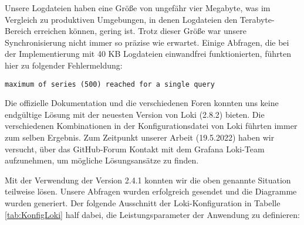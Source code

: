 

Unsere Logdateien haben eine Größe von ungefähr vier Megabyte, was im Vergleich zu produktiven Umgebungen, in denen Logdateien den Terabyte-Bereich erreichen können, gering ist. Trotz dieser Größe war unsere Synchronisierung nicht immer so präzise wie erwartet. Einige Abfragen, die bei der Implementierung mit 40 KB Logdateien einwandfrei funktionierten, führten hier zu folgender Fehlermeldung:

{
\begin{Verbatim}[fontsize=\small, frame=single]
maximum of series (500) reached for a single query  
\end{Verbatim}
}

Die offizielle Dokumentation und die verschiedenen Foren konnten uns keine endgültige Lösung mit der neuesten Version von Loki (2.8.2) bieten. Die verschiedenen Kombinationen in der Konfigurationsdatei von Loki führten immer zum selben Ergebnis. Zum Zeitpunkt unserer Arbeit (19.5.2022) haben wir versucht, über das GitHub-Forum Kontakt mit dem Grafana Loki-Team aufzunehmen, um mögliche Lösungsansätze zu finden.

Mit der Verwendung der Version 2.4.1 konnten wir die oben genannte Situation teilweise lösen. Unsere Abfragen wurden erfolgreich gesendet und die Diagramme wurden generiert. Der folgende Ausschnitt der Loki-Konfiguration in Tabelle \ref{tab:KonfigLoki} half dabei, die Leistungsparameter der Anwendung zu definieren:


